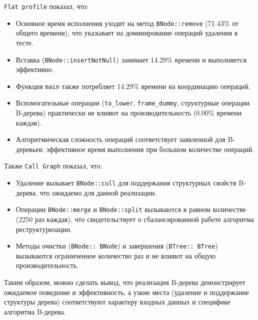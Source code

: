 \texttt{Flat profile} показал, что:
\begin{itemize}
    \item Основное время исполнения уходит на метод \texttt{BNode::remove} (71.43\% от общего времени), что указывает на доминирование операций удаления в тесте.
    \item Вставка (\texttt{BNode::insertNotNull}) занимает 14.29\% времени и выполняется эффективно.
    \item Функция \texttt{main} также потребляет 14.29\% времени на координацию операций.
    \item Вспомогательные операции (\texttt{to\_lower}, \texttt{frame\_dummy}, структурные операции B-дерева) практически не влияют на производительность (0.00\% времени каждая).
    \item Алгоритмическая сложность операций соответствует заявленной для B-деревьев: эффективное время выполнения при большом количестве операций.
\end{itemize}

Также \texttt{Call Graph} показал, что:
\begin{itemize}
    \item Удаление вызывает \texttt{BNode::cull} для поддержания структурных свойств B-дерева, что ожидаемо для данной реализации.
    \item Операции \texttt{BNode::merge} и \texttt{BNode::split} вызываются в равном количестве (2250 раз каждая), что свидетельствует о сбалансированной работе алгоритма реструктуризации.
    \item Методы очистки (\texttt{BNode::~BNode}) и завершения (\texttt{BTree::~BTree}) вызываются ограниченное количество раз и не влияют на общую производительность.
\end{itemize}

Таким образом, можно сделать вывод, что реализация B-дерева демонстрирует ожидаемое поведение и эффективность, а узкие места (удаление и поддержание структуры дерева) соответствуют характеру входных данных и специфике алгоритма B-дерева.

\pagebreak
